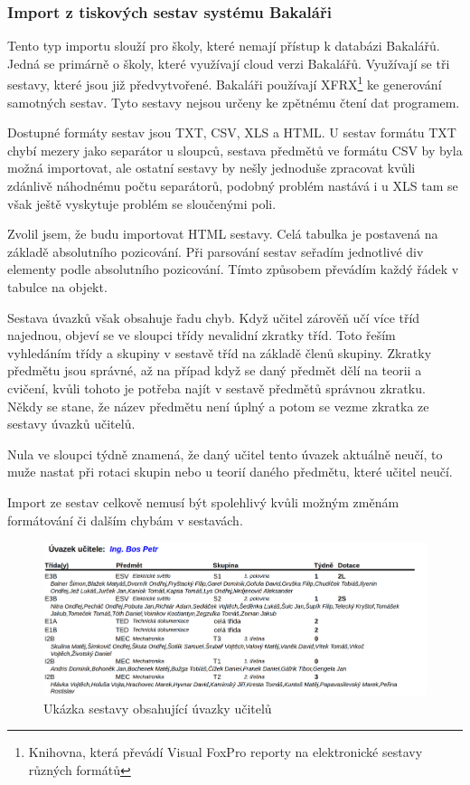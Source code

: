 \subsubsection{Import z tiskových sestav systému Bakaláři}\label{postup:sestavy}
Tento typ importu slouží pro školy, které nemají přístup k databázi Bakalářů. 
Jedná se primárně o školy, které využívají cloud verzi Bakalářů.
Využívají se tři sestavy, které jsou již předvytvořené.
Bakaláři používají XFRX\footnote{Knihovna, která převádí Visual FoxPro reporty na elektronické sestavy různých formátů} ke generování samotných sestav.
Tyto sestavy nejsou určeny ke zpětnému čtení dat programem.

Dostupné formáty sestav jsou TXT, CSV, XLS a HTML.
U sestav formátu TXT chybí mezery jako separátor u sloupců, sestava předmětů ve formátu CSV by byla možná importovat, ale ostatní sestavy by nešly jednoduše zpracovat kvůli zdánlivě náhodnému počtu separátorů, podobný problém nastává i u XLS tam se však ještě vyskytuje problém se sloučenými poli.

Zvolil jsem, že budu importovat HTML sestavy.
Celá tabulka je postavená na základě absolutního pozicování.
Při parsování sestav seřadím jednotlivé div elementy podle absolutního pozicování.
Tímto způsobem převádím každý řádek v tabulce na objekt.

Sestava úvazků však obsahuje řadu chyb.
Když učitel zárověň učí více tříd najednou, objeví se ve sloupci třídy nevalidní zkratky tříd. 
Toto řeším vyhledáním třídy a skupiny v sestavě tříd na základě členů skupiny. 
Zkratky předmětu jsou správné, až na případ když se daný předmět dělí na teorii a cvičení,
kvůli tohoto je potřeba najít v sestavě předmětů správnou zkratku.
Někdy se stane, že název předmětu není úplný a potom se vezme zkratka ze sestavy úvazků učitelů.


Nula ve sloupci týdně znamená, že daný učitel tento úvazek aktuálně neučí, to muže nastat při rotaci skupin nebo u teorií daného předmětu, které učitel neučí. 

Import ze sestav celkově nemusí být spolehlivý kvůli možným změnám formátování či dalším chybám v sestavách.
\begin{figure}[h]
    \centering
    \includegraphics[width=1\linewidth]{Figures/uvazky-ucitelu-ukazka.png}
    \caption{Ukázka sestavy obsahující úvazky učitelů}
    \label{fig:uvazky-ucitelu-ukazka}
\end{figure}

